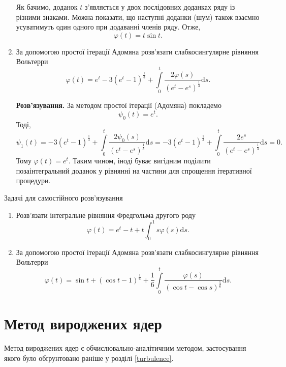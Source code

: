 \documentclass[14pt,twoside]{extreport}
\theoremstyle{mystyle}
\newcommand{\problems}{\bigskip\noindent\fbox{\HandPencilLeft}\hspace{6pt}\textsf{Задачі
		для самостійного розв'язування}}
\numberwithin{equation}{chapter}
\begin{document}
\begin{small}
\begin{enumerate}
  Як бачимо, доданок $t$ з'являється у двох послідовних доданках ряду із різними знаками. Можна показати, що наступні доданки (шум) також взаємно усуватимуть один одного при додаванні членів ряду. Отже,
  \[
   \varphi(t) = t\sin t.
  \]
  \item За допомогою простої ітерації Адомяна розв'язати слабкосингулярне рівняння Вольтерри \[\varphi(t) = e^t - 3(e^t-1)^{\frac{1}{3}} + \int\limits_{0}^{t} \dfrac{2\varphi(s)}{(e^t - e^s)^\frac{1}{3}} \mathrm{d}s.\]
  
  \textbf{Розв'язування.}
  За методом простої ітерації (Адомяна) покладемо
  \[
   \psi_0(t) = e^t.
  \]
  Тоді,
  \[
   \psi_1(t) = -3(e^t-1)^{\frac{1}{3}} + \int\limits_{0}^{t} \dfrac{2\psi_0(s)}{(e^t - e^s)^\frac{1}{3}} \mathrm{d}s= -3 (e^t-1)^{\frac{1}{3}} + \int\limits_{0}^{t} \dfrac{2e^s}{(e^t - e^s)^\frac{1}{3}} \mathrm{d}s =0.
  \]
  Тому $\varphi(t)=e^t$. Таким чином, іноді буває вигідним поділити позаінтегральний доданок у рівнянні на частини для спрощення ітеративної процедури.
 \end{enumerate}

 \problems
\begin{enumerate}
  \item Розв'язати інтегральне рівняння Фредгольма другого роду
  \[
   \varphi(t) = e^t -t + t\int_{0}^{1} s \varphi(s) \mathrm{d}s.
  \]
 \item За допомогою простої ітерації Адомяна розв'язати слабкосингулярне рівняння Вольтерри \[\varphi(t) = \sin t + (\cos t -1)^{\frac{1}{6}} + \dfrac{1}{6}\int\limits_{0}^{t} \dfrac{\varphi(s)}{(\cos t - \cos s)^\frac{5}{6}} \mathrm{d}s.\]
\end{enumerate}

\end{small}

\section{Метод вироджених ядер}

Метод вироджених ядер є обчислювально-аналітичним методом, застосування якого було обґрунтовано раніше у розділі \ref{turbulence}.
\end{document}
